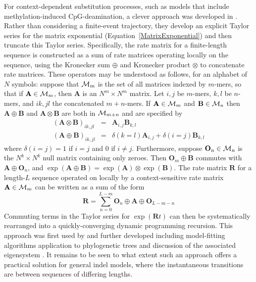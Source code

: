\documentclass{bmcart}
\newcommand{\matr}[1]{\mathbf{#1}}
\newcommand{\eqref}[1]{Equation~\ref{#1}}
\newcommand{\ratematrix}{\matr{R}}
\begin{document}
For context-dependent substitution processes,
such as models that include methylation-induced CpG-deamination,
a clever approach was developed in \cite{LunterHein04}.
Rather than considering a finite-event trajectory, they develop an explicit Taylor series for the matrix exponential
(\eqref{MatrixExponential}) and then truncate this Taylor series.
Specifically, the rate matrix for a finite-length sequence is constructed
as a sum of rate matrices operating locally on the sequence, using the Kronecker sum $\oplus$
and Kronecker product $\otimes$ to concatenate rate matrices.
These operators may be understood as follows, for an alphabet of $N$ symbols:
suppose that ${\cal M}_m$ is the set of all matrices indexed by $m$-mers,
so that if $\matr{A} \in {\cal M}_m$, then $\matr{A}$ is an $N^m \times N^m$ matrix.
Let $i,j$ be $m$-mers, $k,l$ be $n$-mers, and $ik, jl$ the concatenated $m+n$-mers.
If $\matr{A} \in {\cal M}_m$ and $\matr{B} \in {\cal M}_n$
then $\matr{A} \oplus \matr{B}$ and $\matr{A} \otimes \matr{B}$ are both in ${\cal M}_{m+n}$
and are specified by
\begin{eqnarray}
  \left( \matr{A} \otimes \matr{B} \right)_{ik,jl} & = & \matr{A}_{i,j} \matr{B}_{k,l} \\
  \left( \matr{A} \oplus \matr{B} \right)_{ik,jl} & = & \delta(k=l) \matr{A}_{i,j} + \delta(i=j) \matr{B}_{k,l}
\end{eqnarray}
\color{red}
where $\delta(i=j)=1$ if $i=j$ and 0 if $i \neq j$.
\color{black}
Furthermore, suppose $\matr{O}_n \in {\cal M}_n$ is the $N^k \times N^k$ null matrix containing only zeroes.
Then $\matr{O}_m \oplus \matr{B}$ commutes with $\matr{A} \oplus \matr{O}_n$,
and $\exp(\matr{A} \oplus \matr{B}) = \exp(\matr{A}) \otimes \exp(\matr{B})$.
The rate matrix $\ratematrix$ for a length-$L$ sequence operated on locally by a context-sensitive rate matrix $\matr{A} \in {\cal M}_m$ can be written as a sum of the form
\[
\ratematrix = \sum_{n=0}^{L-m} \matr{O}_n \oplus \matr{A} \oplus \matr{O}_{L-m-n}
\]
Commuting terms in the Taylor series for $\exp(\ratematrix t)$ can then be systematically rearranged into a quickly-converging dynamic programming recursion.
This approach was first used by \cite{LunterHein04} and further developed
including model-fitting algorithms \cite{Hobolth2008}
application to phylogenetic trees \cite{BerardGueguen2012}
and discussion of the associated eigensystem \cite{pmid21827770,pmid26135206}.
It remains to be seen to what extent such an approach offers a practical solution for general indel models,
\color{red}
where the instantaneous transitions are between sequences of differing lengths.
\color{black}
\end{document}
